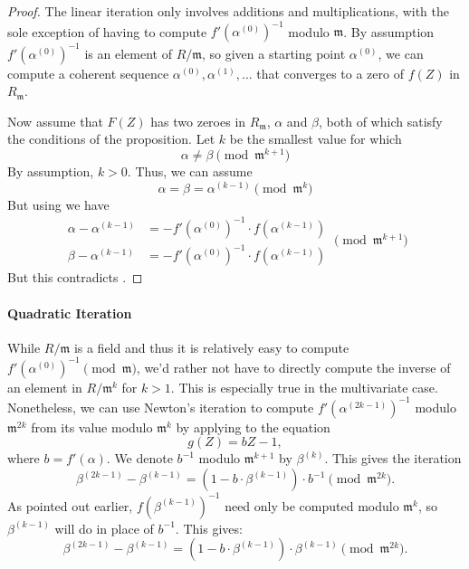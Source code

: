 \begin{proof}
The linear iteration  only involves
additions and multiplications, with the sole exception of having to
compute $f'(\alpha^{(0)})^{-1}$ modulo $\mathfrak{m}$.  By assumption
$f'(\alpha^{(0)})^{-1}$ is an element of $R/\mathfrak{m}$, so given a
starting point $\alpha^{(0)}$, we can compute a coherent sequence
$\alpha^{(0)}, \alpha^{(1)}, \ldots$ that converges to a zero of
$f(Z)$ in $R_\mathfrak{m}$.  

Now assume that $F(Z)$ has two zeroes in $R_\mathfrak{m}$, $\alpha$ and
$\beta$, both of which satisfy the conditions of the proposition.  Let
$k$ be the smallest value for which 
\begin{equation} \label{UNewton:NotEq:Eq}
\alpha \not= \beta \pmod{\mathfrak{m}^{k+1}}
\end{equation}
By assumption, $k > 0$.   Thus, we can assume
\[
\alpha = \beta = \alpha^{(k-1)} \pmod{\mathfrak{m}^{k}}
\]
But using  we have
\[
\begin{aligned}
\alpha - \alpha^{(k-1)} & = - f'(\alpha^{(0)})^{-1} \cdot
f(\alpha^{(k-1)}) \\
\beta - \alpha^{(k-1)} & = - f'(\alpha^{(0)})^{-1} \cdot f(\alpha^{(k-1)})
\end{aligned}
\pmod{\mathfrak{m}^{k+1}}
\]
But this contradicts .
\end{proof}

\paragraph{Quadratic Iteration}

While $R/\mathfrak{m}$ is a field and thus it is relatively easy to compute
$f'(\alpha^{(0)})^{-1} \pmod{\mathfrak{m}}$, we'd rather not have to directly
compute the inverse of an element in $R/\mathfrak{m}^{k}$ for $k > 1$.  This
is especially true in the multivariate case.
Nonetheless, we can use Newton's iteration to compute
$f'(\alpha^{(2k-1)})^{-1}$ modulo $\mathfrak{m}^{2k}$ from its value modulo
$\mathfrak{m}^k$ by applying  to the equation
\[
g(Z) = bZ - 1,
\]
where $b = f'(\alpha)$.  We denote $b^{-1}$ modulo $\mathfrak{m}^{k+1}$ by
$\beta^{(k)}$.  This gives the iteration
\[
\beta^{(2k-1)} - \beta^{(k-1)} = (1 - b \cdot \beta^{(k-1)}) \cdot
b^{-1} \pmod{\mathfrak{m}^{2k}}.
\]
As pointed out earlier, $f(\beta^{(k-1)})^{-1}$ need only be computed
modulo $\mathfrak{m}^k$, so $\beta^{(k-1)}$ will do in place of $b^{-1}$.
This gives:
\begin{equation}
\beta^{(2k-1)} - \beta^{(k-1)} = (1 - b \cdot \beta^{(k-1)}) \cdot
\beta^{(k-1)} \pmod{\mathfrak{m}^{2k}}. 
\label{EQ:2}
\end{equation}

